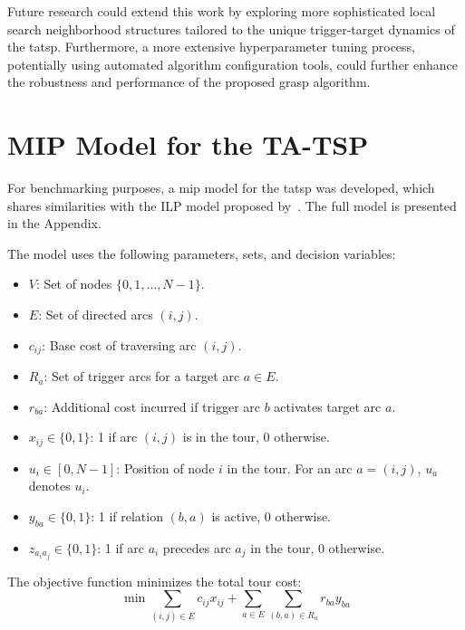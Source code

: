 \documentclass[twocolumn]{article} %
\begin{document}
Future research could extend this work by exploring more sophisticated local search neighborhood structures tailored to the unique trigger-target dynamics of the \gls{tatsp}.
Furthermore, a more extensive hyperparameter tuning process, potentially using automated algorithm configuration tools, could further enhance the robustness and performance of the proposed \gls{grasp} algorithm.

\appendix
\section{MIP Model for the TA-TSP}
\label{sec:mip_model}
For benchmarking purposes, a \gls{mip} model for the \gls{tatsp} was developed, which shares similarities with the ILP model proposed by~\citet{Cerrone}.
The full model is presented in the Appendix.

The model uses the following parameters, sets, and decision variables:
\begin{itemize}
    \item $V$: Set of nodes $\{0, 1, \dots, N-1\}$.
    \item $E$: Set of directed arcs $(i,j)$.
    \item $c_{ij}$: Base cost of traversing arc $(i,j)$.
    \item $R_a$: Set of trigger arcs for a target arc $a \in E$.
    \item $r_{ba}$: Additional cost incurred if trigger arc $b$ activates target arc $a$.
    \item $x_{ij} \in \{0, 1\}$: 1 if arc $(i,j)$ is in the tour, 0 otherwise.
    \item $u_i \in [0, N-1]$: Position of node $i$ in the tour. For an arc $a=(i,j)$, $u_a$ denotes $u_i$.
    \item $y_{ba} \in \{0, 1\}$: 1 if relation $(b,a)$ is active, 0 otherwise.
    \item $z_{a_ia_j} \in \{0, 1\}$: 1 if arc $a_i$ precedes arc $a_j$ in the tour, 0 otherwise.
\end{itemize}

\footnotesize

The objective function minimizes the total tour cost:
\begin{equation} \label{eq:obj}
\min \sum_{(i,j) \in E} c_{ij} x_{ij} + \sum_{a \in E} \sum_{(b,a) \in R_a} r_{ba} y_{ba}
\end{equation}
\end{document}
